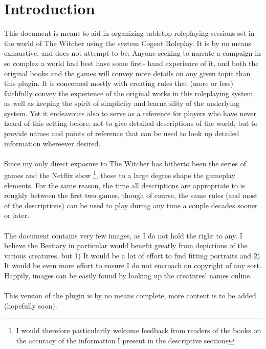 \documentclass[parskip=full,11pt,%
footheight=38pt]{scrreport}
\title{\thetitle}
\author{\href{mailto:TurambarOfManyNames@outlook.com}{Turambar of Many Names}}
\begin{document}
\makeatletter




\maketitle
\setcounter{tocdepth}{1}
\tableofcontents

\chapter*{Introduction}
This document is meant to aid in organizing tabletop roleplaying sessions set in the world of The Witcher using the system Cogent Roleplay.
It is by no means exhaustive, and does not attempt to be: Anyone seeking to narrate a campaign in so complex a world had best have some first-
hand experience of it, and both the original books and the games will convey more details on any given topic than this plugin. It is concerned
mostly with creating rules that (more or less) faithfully convey the experience of the original works in this roleplaying system, as well as
keeping the spirit of simplicity and learnability of the underlying system. Yet it
endeavours also to serve as a reference for players who have never heard of this setting before, not to give detailed descriptions of the world,
but to provide names and points of reference that can be used to look up detailed information whereever desired.
\\\\
Since my only direct exposure to The Witcher has hitherto been the series of games and the Netflix show
\footnote{I would therefore particularily welcome feedback from readers of the books on the accuracy of the information I present in the descriptive
	sections}, these to a large degree shape the gameplay elements.
For the same reason, the time all descriptions are appropriate to is roughly between the first two games, though of course, the same rules (and
most of the descriptions) can be used to play during any time a couple decades sooner or later.
\\\\
The document contains very few images, as I do not hold the right to any. I believe the Bestiary in particular would benefit greatly
from depictions of the various creatures, but 1) It would be a lot of effort to find fitting portraits and 2) It would be even more effort to
ensure I do not encroach on copyright of any sort. Happily, images can be easily found by looking up the creatures' names online.
\\\\
This version of the plugin is by no means complete, more content is to be added (hopefully soon).
\end{document}
